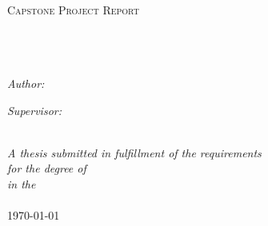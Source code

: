 \documentclass[
12pt, %
english, %
onehalfspacing, %
headsepline, %
]{MastersDoctoralThesis} %
\author{Timothy \textsc{Baker}} %
\begin{document}
\frontmatter %

\pagestyle{plain} %


\begin{titlepage}
\begin{center}

\textsc{\LARGE \univname}\\[1.5cm] %
\textsc{\Large Capstone Project Report}\\[0.5cm] %

\HRule \\[0.4cm] %
{\huge \bfseries \ttitle}\\[0.4cm] %
\HRule \\[1.5cm] %
 
\begin{minipage}{0.4\textwidth}
\begin{flushleft} \large
\emph{Author:}\\
\href{https://www.linkedin.com/in/timothyabaker1/}{\authorname} %
\end{flushleft}
\end{minipage}
\begin{minipage}{0.4\textwidth}
\begin{flushright} \large
\emph{Supervisor:} \\
\href{https://www.uts.edu.au/staff/zenon.chaczko}{\supname} %
\end{flushright}
\end{minipage}\\[3cm]
 
\large \textit{A thesis submitted in fulfillment of the requirements\\ for the degree of \degreename}\\[0.3cm] %
\textit{in the}\\[0.4cm]
\deptname\\[2cm] %
 
{\large \today}\\[4cm] %
 
\vfill
\end{center}
\end{titlepage}
\end{document}
